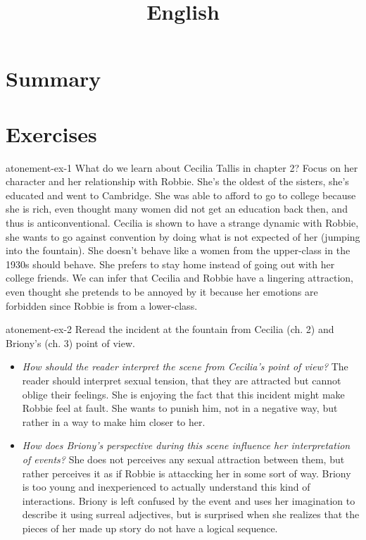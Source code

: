 \documentclass[preview]{standalone}
\begin{document}
\title{English}
\genpage

\section{Summary}

\section{Exercises}

\begin{snippetexercise}{atonement-ex-1}%
{What do we learn about Cecilia Tallis in chapter 2? Focus on her character and her relationship
with Robbie.}
    She's the oldest of the sisters, she's educated and went to Cambridge.
    She was able to afford to go to college because she is rich, even thought many women
    did not get an education back then, and thus is anticonventional.
    Cecilia is shown to have a strange dynamic with Robbie, she wants to go against convention
    by doing what is not expected of her (jumping into the fountain).
    She doesn't behave like a women from the upper-class in the 1930s should behave.
    She prefers to stay home instead of going out with her college friends.
    We can infer that Cecilia and Robbie have a lingering attraction, even thought she
    pretends to be annoyed by it because her emotions are forbidden since Robbie is from a lower-class.
\end{snippetexercise}

\begin{snippetexercise}{atonement-ex-2}%
{Reread the incident at the fountain from Cecilia (ch. 2) and Briony's (ch. 3) point of view.}
\begin{itemize}
    \item \textit{How should the reader interpret the scene from Cecilia's point of view?}
        The reader should interpret sexual tension, that they are attracted but cannot
        oblige their feelings. She is enjoying the fact
        that this incident might make Robbie feel at fault.
        She wants to punish him, not in a negative way, but rather in a way to
        make him closer to her.
    \item \textit{How does Briony's perspective during this scene influence her interpretation of events?}
        She does not perceives any sexual attraction between them,
        but rather perceives it as if Robbie is attaccking her in some sort of way.
        Briony is too young and inexperienced to actually understand this kind of
        interactions. Briony is left confused by the event and uses
        her imagination to describe it using surreal adjectives, but is surprised
        when she realizes that the pieces of her made up story do not have a logical sequence.
\end{itemize}
\end{snippetexercise}
\end{document}
